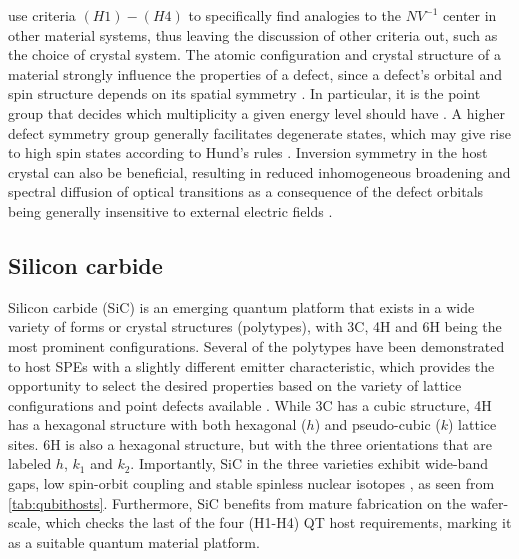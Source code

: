 
\noindent \citeauthor{Weber2010} \cite{Weber2010} use criteria $(H1)-(H4)$ to specifically find analogies to the $NV^{-1}$ center in other material systems, thus leaving the discussion of other criteria out, such as the choice of crystal system. The atomic configuration and crystal structure of a material strongly influence the properties of a defect, since a defect's orbital and spin structure depends on its spatial symmetry \cite{Bassett2019}. In particular, it is the point group that decides which multiplicity a given energy level should have \cite{James1976}. A higher defect symmetry group generally facilitates degenerate states, which may give rise to high spin states according to Hund's rules \cite{Bassett2019, Togan2010}. Inversion symmetry in the host crystal can also be beneficial, resulting in reduced inhomogeneous broadening and spectral diffusion of optical transitions as a consequence of the defect orbitals being generally insensitive to external electric fields \cite{Bassett2019}.

\subsection{Silicon carbide}
\label{silicon-carbide}

Silicon carbide (SiC) is an emerging quantum platform that exists in a wide variety of forms or crystal structures (polytypes), with 3C, 4H and 6H being the most prominent configurations. Several of the polytypes have been demonstrated to host SPEs with a slightly different emitter characteristic, which provides the opportunity to select the desired properties based on the variety of lattice configurations and point defects available \cite{Weber2010, Son2020, Falk2013}. While 3C has a cubic structure, 4H has a hexagonal structure with both hexagonal ($h$) and pseudo-cubic ($k$) lattice sites. 6H is also a hexagonal structure, but with the three orientations that are labeled $h$, $k_1$ and $k_2$. Importantly, SiC in the three varieties exhibit wide-band gaps, low spin-orbit coupling and stable spinless nuclear isotopes \cite{Neudeck1995, Weber2010, Martienssen2005}, as seen from \autoref{tab:qubithosts}. Furthermore, SiC benefits from mature fabrication on the wafer-scale, which checks the last of the four (H1-H4) QT host requirements, marking it as a suitable quantum material platform.

